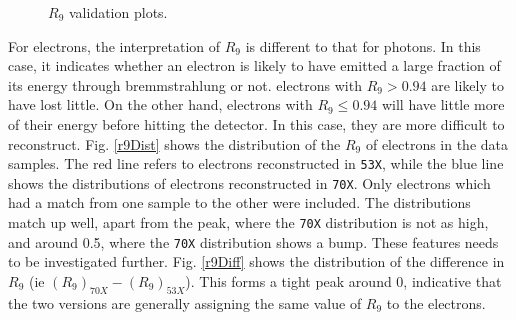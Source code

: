 \documentclass[10pt]{article}
\begin{document}
\begin{figure}[h!]
        \caption{$R_9$ validation plots.}\label{r9Validation}
\end{figure}

For electrons, the interpretation of $R_9$ is different to that for photons. In this case, it indicates whether an electron is likely to have emitted a large fraction of its energy through bremmstrahlung or not. electrons with $R_9>0.94$ are likely to have lost little. On the other hand, electrons with $R_9\leq 0.94$ will have little more of their energy before hitting the detector. In this case, they are more difficult to reconstruct. Fig. \ref{r9Dist} shows the distribution of the $R_9$ of electrons in the data samples. The red line refers to electrons reconstructed in \texttt{53X}, while the blue line shows the distributions of electrons reconstructed in \texttt{70X}. Only electrons which had a match from one sample to the other were included. The distributions match up well, apart from the peak, where the \texttt{70X} distribution is not as high, and around 0.5, where the \texttt{70X} distribution shows a bump. These features needs to be investigated further. Fig. \ref{r9Diff} shows the distribution of the difference in $R_9$ (ie $(R_9)_{70X} -(R_9)_{53X}$). This forms a tight peak around 0, indicative that the two versions are generally assigning the same value of $R_9$ to the electrons.
\end{document}
